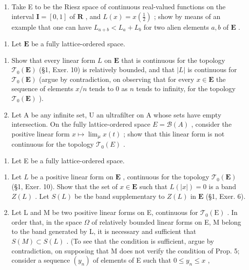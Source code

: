 \begin{enumerate}
\def\labelenumi{\alph{enumi})}
\setcounter{enumi}{1}
\tightlist
\item
  Take E to be the Riesz space of continuous real-valued functions on the interval \(\mathbf{I} = [0,1]\) of \(\mathbf{R}\) , and \(L(x) = x\left(\frac{1}{2}\right)\) ; show by means of an example that one can have \(L_{a + b} < L_a + L_b\) for two alien elements \(a, b\) of \(\mathbf{E}\) .
\end{enumerate}

\begin{enumerate}
\def\labelenumi{\arabic{enumi})}
\setcounter{enumi}{2}
\tightlist
\item
  Let \(\mathbf{E}\) be a fully lattice-ordered space.
\end{enumerate}

\begin{enumerate}
\def\labelenumi{\alph{enumi})}
\item
  Show that every linear form \(L\) on \(\mathbf{E}\) that is continuous for the topology \(\mathcal{T}_0(\mathbf{E})\) (§1, Exer. 10) is relatively bounded, and that \(|L|\) is continuous for \(\mathcal{T}_0(\mathbf{E})\) (argue by contradiction, on observing that for every \(x \in \mathbf{E}\) the sequence of elements \(x / n\) tends to 0 as \(n\) tends to infinity, for the topology \(\mathcal{T}_0(\mathbf{E})\) ).
\item
  Let A be any infinite set, U an ultrafilter on A whose sets have empty intersection. On the fully lattice-ordered space \(E = \mathcal{B}(A)\) , consider the positive linear form \(x \mapsto \lim_{\mu} x(t)\) ; show that this linear form is not continuous for the topology \(\mathcal{T}_{0}(E)\) .
\end{enumerate}

\begin{enumerate}
\def\labelenumi{\arabic{enumi})}
\setcounter{enumi}{3}
\tightlist
\item
  Let E be a fully lattice-ordered space.
\end{enumerate}

\begin{enumerate}
\def\labelenumi{\alph{enumi})}
\item
  Let \(L\) be a positive linear form on \(\mathbf{E}\) , continuous for the topology \(\mathcal{T}_0(\mathbf{E})\) (§1, Exer. 10). Show that the set of \(x \in \mathbf{E}\) such that \(L(|x|) = 0\) is a band \(Z(L)\) . Let \(S(L)\) be the band supplementary to \(Z(L)\) in \(\mathbf{E}\) (§1, Exer. 6).
\item
  Let L and M be two positive linear forms on E, continuous for \(\mathcal{T}_{0}(\mathrm{E})\) . In order that, in the space \(\Omega\) of relatively bounded linear forms on E, M belong to the band generated by L, it is necessary and sufficient that \(S(M) \subset S(L)\) . (To see that the condition is sufficient, argue by contradiction, on supposing that M does not verify the condition of Prop. 5; consider a sequence \((y_{n})\) of elements of E such that \(0 \leqslant y_{n} \leqslant x\) ,
\end{enumerate}

